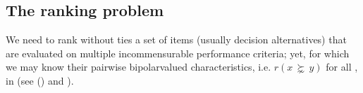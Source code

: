 \documentclass[a4paper,12pt,english]{sphinxhowto}
\begin{document}
\subsection{The ranking problem}
\label{\detokenize{tutorial:the-ranking-problem}}
We need to rank without ties a set  of items (usually decision alternatives) that are evaluated on multiple incommensurable performance criteria; yet, for which we may know their pairwise bipolar\sphinxhyphen{}valued  characteristics, i.e. \(r(x\, \succnsim \, y)\) for all ,  in  (see {\hyperref[\detokenize{tutorial:codual-digraph-label}]{}} () and ).
\end{document}
